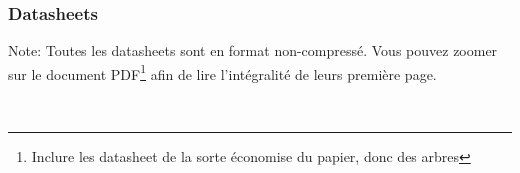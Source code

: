 \documentclass[10pt,a4paper,final]{article}
\begin{document}
\begin{spacing}{1.5}
\subsubsection{Datasheets}
Note: Toutes les datasheets sont en format non-compressé. Vous pouvez zoomer sur le document PDF\footnote{Inclure les datasheet de la sorte économise du papier, donc des arbres} afin de lire l'intégralité de leurs première page.
\begin{multicols}{3}
\\


\end{multicols}
\end{spacing}
\end{document}
